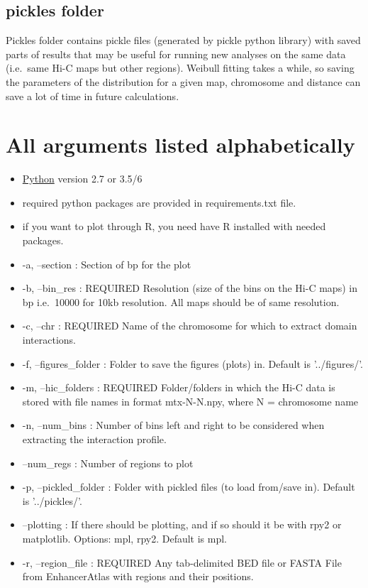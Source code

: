 \subsection{pickles folder}
Pickles folder contains pickle files (generated by pickle python library) with saved parts of results that may be useful
for running new analyses on the same data (i.e.~same Hi-C maps but other regions). Weibull fitting takes a while, so
saving the parameters of the distribution for a given map, chromosome and distance can save a lot of time in future
calculations.

\section{All arguments listed alphabetically}
\label{sec:arguments}
\begin{itemize}
\item \href{https://www.python.org}{Python} version 2.7 or 3.5/6
\item required python packages are provided in requirements.txt file.
\item if you want to plot through R, you need have R installed with needed packages.
\item -a, --section : Section of bp for the plot
\item -b, --bin\_res : REQUIRED Resolution (size of the bins on the Hi-C maps) in bp i.e.~10000 for 10kb resolution. All maps
should be of same resolution.
\item -c, --chr : REQUIRED Name of the chromosome for which to extract domain interactions.
\item -f, --figures\_folder : Folder to save the figures (plots) in. Default is '../figures/'.
\item -m, --hic\_folders : REQUIRED Folder/folders in which the Hi-C data is stored with file names in format mtx-N-N.npy, where N = chromosome name
\item -n, --num\_bins : Number of bins left and right to be considered when extracting the interaction profile.
\item --num\_regs : Number of regions to plot
\item -p, --pickled\_folder : Folder with pickled files (to load from/save in). Default is '../pickles/'.
\item --plotting : If there should be plotting, and if so should it be with rpy2 or matplotlib. Options: mpl, rpy2. Default is mpl.
\item -r, --region\_file : REQUIRED Any tab-delimited BED file or FASTA File from EnhancerAtlas with regions and their positions.

\end{itemize}
